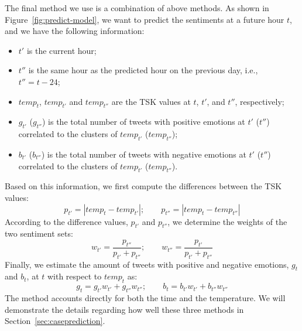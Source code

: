 The final method we use is a combination of above methods. As shown in Figure~\ref{fig:predict-model}, we want to predict the sentiments at a future hour $t$, and we have the following information:
%
\begin{itemize}
\vspace{-.1in}
\setlength{\topsep}{-0.1in}
\setlength{\itemsep}{-0.05in}
\item $t'$ is the current hour;
\item $t''$ is the same hour as the predicted hour on the previous day, i.e., $t'' = t - 24$;
\item $temp_t$, $temp_{t'}$ and $temp_{t''}$ are the TSK values at $t$, $t'$, and $t''$, respectively;
\item $g_{t'}$ ($g_{t''}$) is the total number of tweets with positive emotions at $t'$ ($t''$) correlated to the clusters of $temp_{t'}$ ($temp_{t''}$);
\item $b_{t'}$ ($b_{t''}$) is the total number of tweets with negative emotions at $t'$ ($t''$) correlated to the clusters of $temp_{t'}$ ($temp_{t''}$).
\end{itemize}
\vspace{-0.05in}
%
Based on this information, we first compute the differences between the TSK values:
%
\begin{equation}
\label{eq:p}
p_{t'}=\left | temp_t - temp_{t'} \right |;	\qquad p_{t''}=\left | temp_t - temp_{t''} \right |	
\end{equation}
%
According to the difference values, $p_{t'}$ and $p_{t''}$, we determine the weights of the two sentiment sets:
%
\begin{equation}
\label{eq:w}
w_{t'}=\frac{p_{t''}}{p_{t'} + p_{t''}}; 	\qquad w_{t''}=\frac{p_{t'}}{p_{t'} + p_{t''}}
\end{equation}
%
Finally, we estimate the amount of tweets with positive and negative emotions, $g_t$ and $b_t$, at $t$ with respect to $temp_t$ as:
%
\begin{equation}
\label{eq:gb}
g_t = g_{t'}w_{t'} + g_{t''}w_{t''};	\qquad b_t = b_{t'}w_{t'} + b_{t''}w_{t''}	
\end{equation}
%
The method accounts directly for both the time and the temperature. We will demonstrate the details regarding how well these three methods in Section~\ref{sec:caseprediction}.

